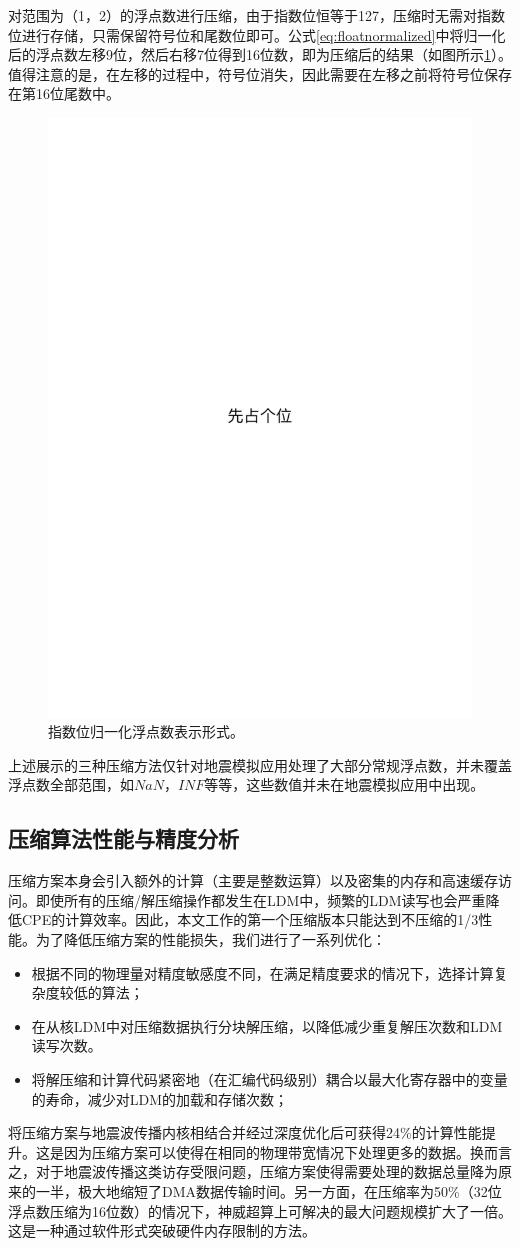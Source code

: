 \documentclass[degree=doctor]{thuthesis}
\begin{document}
对范围为（1，2）的浮点数进行压缩，由于指数位恒等于127，压缩时无需对指数位进行存储，只需保留符号位和尾数位即可。公式\ref{eq:floatnormalized}中将归一化后的浮点数左移9位，然后右移7位得到16位数，即为压缩后的结果（如图所示\ref{fig:ieeefloatnormalized}）。值得注意的是，在左移的过程中，符号位消失，因此需要在左移之前将符号位保存在第16位尾数中。

\begin{figure}[ht]
\centering
\includegraphics[width=0.3\columnwidth]{placeholder.pdf}
\caption{指数位归一化浮点数表示形式。}
\label{fig:ieeefloatnormalized}
\end{figure}

上述展示的三种压缩方法仅针对地震模拟应用处理了大部分常规浮点数，并未覆盖浮点数全部范围，如$NaN$，$INF$等等，这些数值并未在地震模拟应用中出现。

\subsection{压缩算法性能与精度分析}

压缩方案本身会引入额外的计算（主要是整数运算）以及密集的内存和高速缓存访问。即使所有的压缩/解压缩操作都发生在LDM中，频繁的LDM读写也会严重降低CPE的计算效率。因此，本文工作的第一个压缩版本只能达到不压缩的1/3性能。为了降低压缩方案的性能损失，我们进行了一系列优化：

\begin{itemize}
  \item 根据不同的物理量对精度敏感度不同，在满足精度要求的情况下，选择计算复杂度较低的算法；
  \item 在从核LDM中对压缩数据执行分块解压缩，以降低减少重复解压次数和LDM读写次数。
  \item 将解压缩和计算代码紧密地（在汇编代码级别）耦合以最大化寄存器中的变量的寿命，减少对LDM的加载和存储次数；
\end{itemize}

将压缩方案与地震波传播内核相结合并经过深度优化后可获得24\%的计算性能提升。这是因为压缩方案可以使得在相同的物理带宽情况下处理更多的数据。换而言之，对于地震波传播这类访存受限问题，压缩方案使得需要处理的数据总量降为原来的一半，极大地缩短了DMA数据传输时间。另一方面，在压缩率为50\%（32位浮点数压缩为16位数）的情况下，神威超算上可解决的最大问题规模扩大了一倍。这是一种通过软件形式突破硬件内存限制的方法。
\end{document}

